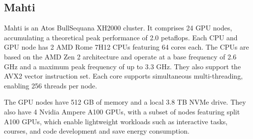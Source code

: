 
\subsection{Mahti}

Mahti \cite{mahti} is an Atos BullSequana XH2000 cluster. It comprises 24 GPU nodes, accumulating a theoretical peak performance of 2.0 petaflops. Each CPU and GPU node has 2 AMD Rome 7H12 CPUs featuring 64 cores each. The CPUs are based on the AMD Zen 2 architecture and operate at a base frequency of 2.6 GHz and a maximum peak frequency of up to 3.3 GHz. They also support the AVX2 vector instruction set. Each core supports simultaneous multi-threading, enabling 256 threads per node.

The GPU nodes have 512 GB of memory and a local 3.8 TB NVMe drive. They also have 4 Nvidia Ampere A100 GPUs, with a subset of nodes featuring split A100 GPUs, which enable lightweight workloads such as interactive tasks, courses, and code development and save energy consumption.




